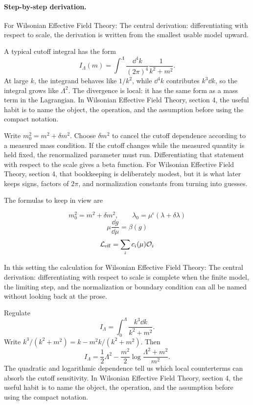 \paragraph{Step-by-step derivation.}

For Wilsonian Effective Field Theory: The central derivation: differentiating with respect to scale, the derivation is written from the smallest usable model upward.

A typical cutoff integral has the form
\[
  I_\Lambda(m)=\int^{\Lambda}\frac{\dd^4k}{(2\pi)^4}\frac{1}{k^2+m^2}.
\]
At large \(k\), the integrand behaves like \(1/k^2\), while \(\dd^4k\) contributes \(k^3\dd k\), so the integral grows like \(\Lambda^2\).  The divergence is local: it has the same form as a mass term in the Lagrangian.  In Wilsonian Effective Field Theory, section 4, the useful habit is to name the object, the operation, and the assumption before using the compact notation.

Write \(m_0^2=m^2+\delta m^2\).  Choose \(\delta m^2\) to cancel the cutoff dependence according to a measured mass condition.  If the cutoff changes while the measured quantity is held fixed, the renormalized parameter must run.  Differentiating that statement with respect to the scale gives a beta function.  For Wilsonian Effective Field Theory, section 4, that bookkeeping is deliberately modest, but it is what later keeps signs, factors of \(2\pi\), and normalization constants from turning into guesses.

The formulas to keep in view are

\[
  m_0^2=m^2+\delta m^2,\qquad \lambda_0=\mu^\epsilon(\lambda+\delta\lambda)
\]
\[
  \mu\frac{\dd g}{\dd\mu}=\beta(g)
\]
\[
  \mathcal L_{\mathrm{eff}}=\sum_i c_i(\mu)\mathcal O_i
\]

In this setting the calculation for Wilsonian Effective Field Theory: The central derivation: differentiating with respect to scale is complete when the finite model, the limiting step, and the normalization or boundary condition can all be named without looking back at the prose.




\begin{example}
Regulate
\[
  I_\Lambda=\int_0^\Lambda\frac{k^3\dd k}{k^2+m^2}.
\]
Write \(k^3/(k^2+m^2)=k-m^2k/(k^2+m^2)\).  Then
\[
  I_\Lambda=\frac12\Lambda^2-\frac{m^2}{2}\log\frac{\Lambda^2+m^2}{m^2}.
\]
The quadratic and logarithmic dependence tell us which local counterterms can absorb the cutoff sensitivity.  In Wilsonian Effective Field Theory, section 4, the useful habit is to name the object, the operation, and the assumption before using the compact notation.
\end{example}



